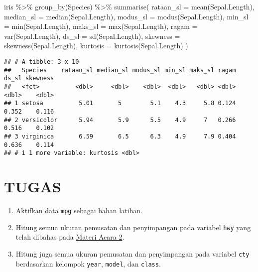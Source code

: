 \documentclass[
]{book}
\newenvironment{Shaded}{\begin{snugshade}}{\end{snugshade}}
\newcommand{\AttributeTok}[1]{\textcolor[rgb]{0.77,0.63,0.00}{#1}}
\newcommand{\FunctionTok}[1]{\textcolor[rgb]{0.00,0.00,0.00}{#1}}
\newcommand{\NormalTok}[1]{#1}
\newcommand{\SpecialCharTok}[1]{\textcolor[rgb]{0.00,0.00,0.00}{#1}}
\providecommand{\tightlist}{%
  \setlength{\itemsep}{0pt}\setlength{\parskip}{0pt}}
\begin{document}
\begin{Shaded}
\begin{Highlighting}[]
\NormalTok{iris }\SpecialCharTok{\%\textgreater{}\%} \FunctionTok{group\_by}\NormalTok{(Species) }\SpecialCharTok{\%\textgreater{}\%} \FunctionTok{summarise}\NormalTok{(}
  \AttributeTok{rataan\_sl =} \FunctionTok{mean}\NormalTok{(Sepal.Length),}
  \AttributeTok{median\_sl =} \FunctionTok{median}\NormalTok{(Sepal.Length),}
  \AttributeTok{modus\_sl  =} \FunctionTok{modus}\NormalTok{(Sepal.Length),}
  \AttributeTok{min\_sl    =} \FunctionTok{min}\NormalTok{(Sepal.Length),}
  \AttributeTok{maks\_sl   =} \FunctionTok{max}\NormalTok{(Sepal.Length),}
  \AttributeTok{ragam     =} \FunctionTok{var}\NormalTok{(Sepal.Length),}
  \AttributeTok{ds\_sl     =} \FunctionTok{sd}\NormalTok{(Sepal.Length),}
  \AttributeTok{skewness  =} \FunctionTok{skewness}\NormalTok{(Sepal.Length),}
  \AttributeTok{kurtosis  =} \FunctionTok{kurtosis}\NormalTok{(Sepal.Length)}
\NormalTok{)}
\end{Highlighting}
\end{Shaded}

\begin{verbatim}
## # A tibble: 3 x 10
##   Species    rataan_sl median_sl modus_sl min_sl maks_sl ragam ds_sl skewness
##   <fct>          <dbl>     <dbl>    <dbl>  <dbl>   <dbl> <dbl> <dbl>    <dbl>
## 1 setosa          5.01       5        5.1    4.3     5.8 0.124 0.352    0.116
## 2 versicolor      5.94       5.9      5.5    4.9     7   0.266 0.516    0.102
## 3 virginica       6.59       6.5      6.3    4.9     7.9 0.404 0.636    0.114
## # i 1 more variable: kurtosis <dbl>
\end{verbatim}

\hypertarget{tugas}{%
\section{TUGAS}\label{tugas}}

\begin{enumerate}
\def\labelenumi{\arabic{enumi}.}
\tightlist
\item
  Aktifkan data \texttt{mpg} sebagai bahan latihan.
\item
  Hitung semua ukuran pemusatan dan penyimpangan pada variabel \texttt{hwy} yang telah dibahas pada \protect\hyperlink{a2-materi}{Materi Acara 2}.
\item
  Hitung juga semua ukuran pemusatan dan penyimpangan pada variabel \texttt{cty} berdasarkan kelompok \texttt{year}, \texttt{model}, dan \texttt{class}.
\end{enumerate}
\end{document}
